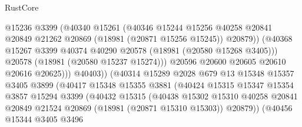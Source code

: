 \begin{lexlean}{RustCore}
\begin{coremodule}
                                  @15236
                                  @3399
                                  (@40340
                                    @15261
                                    (@40346
                                      @15244
                                      @15256
                                      @40258
                                      @20841
                                      @20849
                                      @21262
                                      @20869
                                      (@18981 (@20871 @15256 @15245))
                                      @20879))
                                  (@40368
                                    @15267
                                    @3399
                                    @40374
                                    @40290
                                    @20578
                                    (@18981 (@20580 @15268 @3405)))
                                  @20578
                                  (@18981 (@20580 @15237 @15274)))
                                @20596
                                @20600
                                @20605
                                @20610
                                @20616
                                @20625)))
                          @40403))
                      (@40314
                        @15289
                        @2028
                        @679
                        @13
                        @15348
                        @15357
                        @3405
                        @3899
                        (@40417
                          @15348
                          @15355
                          @3881
                          (@40424
                            @15315
                            @15347
                            @15354
                            @3857
                            @15294
                            @3399
                            (@40432
                              @15315
                              (@40438
                                @15302
                                @15310
                                @40258
                                @20841
                                @20849
                                @21524
                                @20869
                                (@18981 (@20871 @15310 @15303))
                                @20879))
                            (@40456
                              @15344
                              @3405
                              @3496

\end{coremodule}
\end{lexlean}
